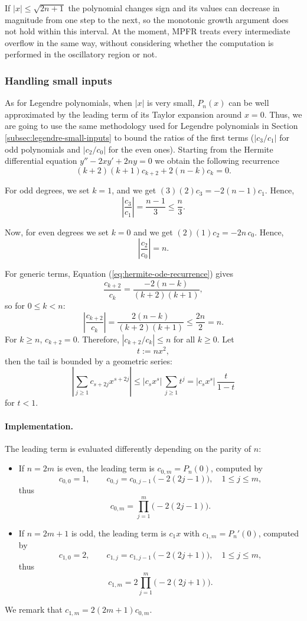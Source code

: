 \documentclass[12pt]{amsart}
\begin{document}
If $|x| \leq \sqrt{2n+1}$ the polynomial changes sign and its values can
decrease in magnitude from one step to the next, so the monotonic growth
argument does not hold within this interval. At the moment, MPFR treats every
intermediate overflow in the same way, without considering whether the
computation is performed in the oscillatory region or not.

\subsubsection{Handling small inputs}

As for Legendre polynomials, when $|x|$ is very small, $P_n(x)$ can be well
approximated by the leading term of its Taylor expansion around $x=0$. Thus,
we are going to use the same methodology used for Legendre polynomials in Section
\ref{subsec:legendre-small-inputs} to bound the ratios of the first terms
($|c_3/c_1|$ for odd polynomials and $|c_2/c_0|$ for the even ones). Starting
from the Hermite differential equation $y'' - 2x y' + 2ny = 0$ we obtain the
following recurrence
\begin{equation} \label{eq:hermite-ode-recurrence}
  (k+2)(k+1)c_{k+2}
  + 2 (n - k) c_k = 0.
\end{equation}

For odd degrees, we set $k = 1$, and we get $(3)(2)c_3 = -2(n-1)c_1$. Hence,
\[
  \left|\frac{c_3}{c_1}\right| = \frac{n-1}{3} \le \frac{n}{3}.
\]

Now, for even degrees we set $k = 0$ and we get $(2)(1)c_2 = -2n\,c_0$. Hence,
\[
  \left|\frac{c_2}{c_0}\right| = n.
\]

For generic terms, Equation (\ref{eq:hermite-ode-recurrence}) gives
\[
  \frac{c_{k+2}}{c_k} = \frac{-2(n-k)}{(k+2)(k+1)},
\]
so for $0 \le k < n$:
\[
  \left|\frac{c_{k+2}}{c_k}\right|
  =
  \frac{2(n-k)}{(k+2)(k+1)}
  \le \frac{2n}{2} = n.
\]
For $k \ge n$, $c_{k+2} = 0$. Therefore, $|c_{k+2}/c_k| \le n$ for all $k \ge 0$.
Let
\[
  t := nx^2,
\]
then the tail is bounded by a geometric series:
\[
  \left|\sum_{j \ge 1} c_{s+2j}x^{s+2j}\right|
  \le |c_s x^s|\,\sum_{j \ge 1} t^j
  = |c_s x^s|\,\frac{t}{1-t}
\]
for $t < 1$.

\paragraph{\textbf{Implementation.}} The leading term is evaluated differently
depending on the parity of $n$:
\begin{itemize}
\item If $n=2m$ is even, the leading term is $c_{0,m} = P_n(0)$, computed by
  \[
    c_{0,0}=1, \qquad c_{0,j}=c_{0,j-1}\,\big(-2(2j-1)\big),
    \quad 1 \leq j \leq m,
  \]
  thus
  \[
    c_{0,m} = \prod_{j=1}^{m} \big(-2(2j-1)\big).
  \]

\item If $n=2m+1$ is odd, the leading term is $c_1x$ with
  $c_{1,m}=P_n'(0)$, computed by
  \[
    c_{1,0}=2, \qquad c_{1,j}=c_{1,j-1}\,\big(-2(2j+1)\big),
    \quad 1 \leq j \leq m,
  \]
  thus
  \[
    c_{1,m} = 2\prod_{j=1}^{m} \big(-2(2j+1)\big).
  \]
\end{itemize}
We remark that $c_{1,m} = 2(2m+1)c_{0,m}$.
\end{document}
